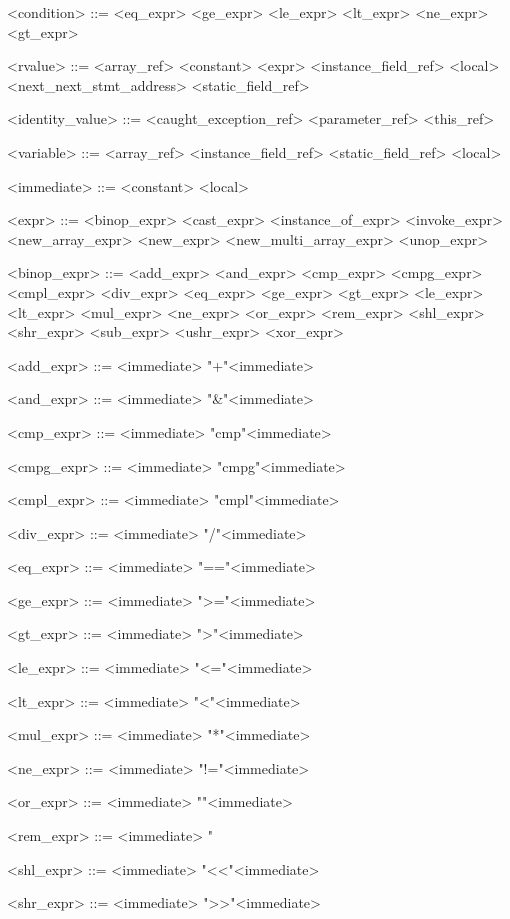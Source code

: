 \documentclass{report}
\begin{document}
\begin{grammar}
<condition> ::= <eq_expr> \alt <ge_expr> \alt <le_expr> \alt <lt_expr> \alt <ne_expr> \alt <gt_expr>

<rvalue> ::= <array_ref> \alt <constant> \alt <expr> \alt <instance_field_ref> \alt <local> <next_next_stmt_address> \alt <static_field_ref>

<identity_value> ::= <caught_exception_ref> \alt <parameter_ref> \alt <this_ref>

<variable> ::= <array_ref> \alt <instance_field_ref> \alt <static_field_ref> \alt <local>

<immediate> ::= <constant> \alt <local>

<expr> ::= <binop_expr> \alt <cast_expr> \alt <instance_of_expr> \alt <invoke_expr> \alt <new_array_expr> \alt <new_expr> \alt <new_multi_array_expr> \alt <unop_expr>

<binop_expr> ::= <add_expr> \alt <and_expr> \alt <cmp_expr> \alt <cmpg_expr> \alt <cmpl_expr> \alt <div_expr> \alt <eq_expr> \alt <ge_expr> \alt <gt_expr> \alt <le_expr> \alt <lt_expr> \alt <mul_expr> \alt <ne_expr> \alt <or_expr> \alt <rem_expr> \alt <shl_expr> \alt <shr_expr> \alt <sub_expr> \alt <ushr_expr> \alt <xor_expr>

<add_expr> ::= <immediate> "+"<immediate>

<and_expr> ::= <immediate> "&"<immediate>

<cmp_expr> ::= <immediate> "cmp"<immediate>

<cmpg_expr> ::= <immediate> "cmpg"<immediate>

<cmpl_expr> ::= <immediate> "cmpl"<immediate>

<div_expr> ::= <immediate> "/"<immediate>

<eq_expr> ::= <immediate> "=="<immediate>

<ge_expr> ::= <immediate> ">="<immediate>

<gt_expr> ::= <immediate> ">"<immediate>

<le_expr> ::= <immediate> "<="<immediate>

<lt_expr> ::= <immediate> "<"<immediate>

<mul_expr> ::= <immediate> "*"<immediate>

<ne_expr> ::= <immediate> "!="<immediate>

<or_expr> ::= <immediate> "\alt"<immediate>

<rem_expr> ::= <immediate> "%

<shl_expr> ::= <immediate> "<<"<immediate>

<shr_expr> ::= <immediate> ">>"<immediate>


\end{grammar}
\end{document}
